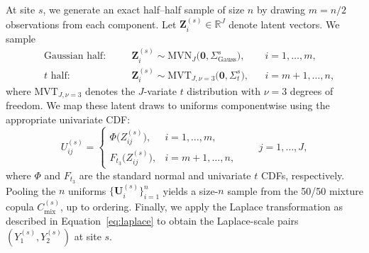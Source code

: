 \documentclass[
  12pt]{article}
\newcommand{\RG}[1]{\Sigma_{\mathrm{Gauss}}^{#1}}   %
\newcommand{\RT}[1]{\Sigma_{t}^{#1}}                %
\begin{document}
At site $s$, we generate an exact half–half sample of size $n$ by drawing $m=n/2$ observations from each component. 
Let $\mathbf{Z}_{i}^{(s)}\in\mathbb{R}^J$ denote latent vectors. We sample
\begin{equation} ~\label{eq:mix_latent}
\begin{aligned}
&\text{Gaussian half:}\quad &&\mathbf{Z}_{i}^{(s)} \sim \mbox{MVN}_J\!\big(\mathbf{0},\RG{s}\big),
&& i=1,\dots,m,\\[2pt]
&\text{$t$ half:}\quad      &&\mathbf{Z}_{i}^{(s)} \sim \mbox{MVT}_{J,\nu=3}\!\big(\mathbf{0},\RT{s}\big),
&& i=m+1,\dots,n,
\end{aligned}
\end{equation}
where $\mbox{MVT}_{J, \nu = 3}$ denotes the $J$-variate $t$ distribution with $\nu=3$ degrees of freedom.
We map these latent draws to uniforms componentwise using the appropriate univariate CDF:
\[
U_{ij}^{(s)} =
\begin{cases}
\Phi\!\big(Z_{ij}^{(s)}\big), & i=1,\dots,m,\\[4pt]
F_{t_3}\!\big(Z_{ij}^{(s)}\big), & i=m+1,\dots,n,
\end{cases}
\qquad j=1,\dots,J,
\]
where $\Phi$ and $F_{t_3}$ are the standard normal and univariate $t$ CDFs, respectively.
Pooling the $n$ uniforms $\{\mathbf{U}_{i}^{(s)}\}_{i=1}^n$ yields a size-$n$ sample from the 50/50 mixture copula $C_{\mathrm{mix}}^{(s)}$, up to ordering. 
Finally, we apply the Laplace transformation as described in Equation~\eqref{eq:laplace} to obtain the Laplace-scale pairs \((Y_{1}^{(s)},Y_{2}^{(s)})\) at site \(s\).
\end{document}
